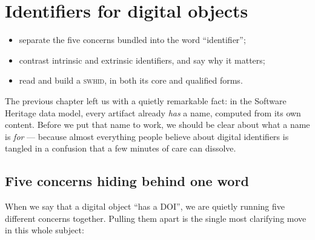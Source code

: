 \chapter{Identifiers for digital objects}
\label{ch:identifiers}


\begin{objectives}\small
\begin{itemize}[nosep,leftmargin=*]
  \item separate the five concerns bundled into the word ``identifier'';
  \item contrast intrinsic and extrinsic identifiers, and say why it matters;
  \item read and build a \textsc{swhid}, in both its core and qualified forms.
\end{itemize}
\end{objectives}

The previous chapter left us with a quietly remarkable fact: in the Software Heritage data model,
every artifact already \emph{has} a name, computed from its own content. Before we put that name
to work, we should be clear about what a name is \emph{for} --- because almost everything people
believe about digital identifiers is tangled in a confusion that a few minutes of care can
dissolve.


\section{Five concerns hiding behind one word}

When we say that a digital object \enquote{has a DOI}, we are quietly running five different
concerns together. Pulling them apart is the single most clarifying move in this whole subject:


